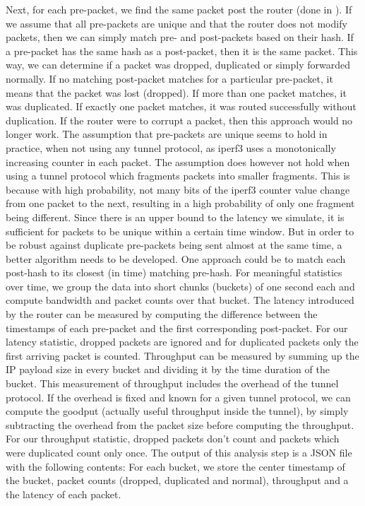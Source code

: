 Next, for each pre-packet, we find the same packet post the router (done in ).
If we assume that all pre-packets are unique and that the router does not modify packets, then we can simply match pre- and post-packets based on their hash.
If a pre-packet has the same hash as a post-packet, then it is the same packet.
This way, we can determine if a packet was dropped, duplicated or simply forwarded normally.
If no matching post-packet matches for a particular pre-packet, it means that the packet was lost (dropped).
If more than one packet matches, it was duplicated.
If exactly one packet matches, it was routed successfully without duplication.
If the router were to corrupt a packet, then this approach would no longer work.
The assumption that pre-packets are unique seems to hold in practice, when not using any tunnel protocol, as iperf3 uses a monotonically increasing counter in each packet.
The assumption does however not hold when using a tunnel protocol which fragments packets into smaller fragments.
This is because with high probability, not many bits of the iperf3 counter value change from one packet to the next, resulting in a high probability of only one fragment being different.
Since there is an upper bound to the latency we simulate, it is sufficient for packets to be unique within a certain time window.
But in order to be robust against duplicate pre-packets being sent almost at the same time, a better algorithm needs to be developed.
One approach could be to match each post-hash to its closest (in time) matching pre-hash.
For meaningful statistics over time, we group the data into short chunks (buckets) of one second each and compute bandwidth and packet counts over that bucket.
The latency introduced by the router can be measured by computing the difference between the timestamps of each pre-packet and the first corresponding post-packet.
For our latency statistic, dropped packets are ignored and for duplicated packets only the first arriving packet is counted.
Throughput can be measured by summing up the IP payload size in every bucket and dividing it by the time duration of the bucket.
This measurement of throughput includes the overhead of the tunnel protocol.
If the overhead is fixed and known for a given tunnel protocol, we can compute the goodput (actually useful throughput inside the tunnel), by simply subtracting the overhead from the packet size before computing the throughput.
For our throughput statistic, dropped packets don't count and packets which were duplicated count only once.
The output of this analysis step is a JSON file with the following contents:
For each bucket, we store the center timestamp of the bucket, packet counts (dropped, duplicated and normal), throughput and a the latency of each packet.

